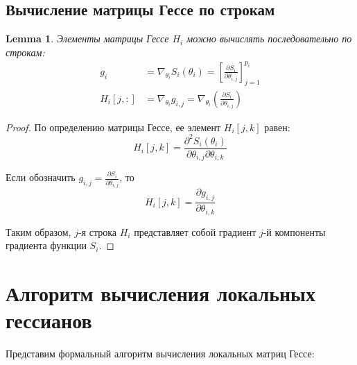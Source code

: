 \documentclass[12pt]{article}
\newtheorem{lemma}{Lemma}
\begin{document}
\subsection{Вычисление матрицы Гессе по строкам}

\begin{lemma}
Элементы матрицы Гессе $H_i$ можно вычислять последовательно по строкам:
\begin{equation}
\begin{aligned}
g_i &= \nabla_{\theta_i} S_i(\theta_i) = \left[ \frac{\partial S_i}{\partial \theta_{i,j}} \right]_{j=1}^{p_i} \\
H_i[j,:] &= \nabla_{\theta_i} g_{i,j} = \nabla_{\theta_i} \left( \frac{\partial S_i}{\partial \theta_{i,j}} \right)
\end{aligned}
\end{equation}
\end{lemma}

\begin{proof}
По определению матрицы Гессе, ее элемент $H_i[j,k]$ равен:
\begin{equation}
H_i[j,k] = \frac{\partial^2 S_i(\theta_i)}{\partial \theta_{i,j} \partial \theta_{i,k}}
\end{equation}

Если обозначить $g_{i,j} = \frac{\partial S_i}{\partial \theta_{i,j}}$, то 
\begin{equation}
H_i[j,k] = \frac{\partial g_{i,j}}{\partial \theta_{i,k}}
\end{equation}

Таким образом, $j$-я строка $H_i$ представляет собой градиент $j$-й компоненты градиента функции $S_i$.
\end{proof}

\section{Алгоритм вычисления локальных гессианов}

Представим формальный алгоритм вычисления локальных матриц Гессе:
\end{document}
